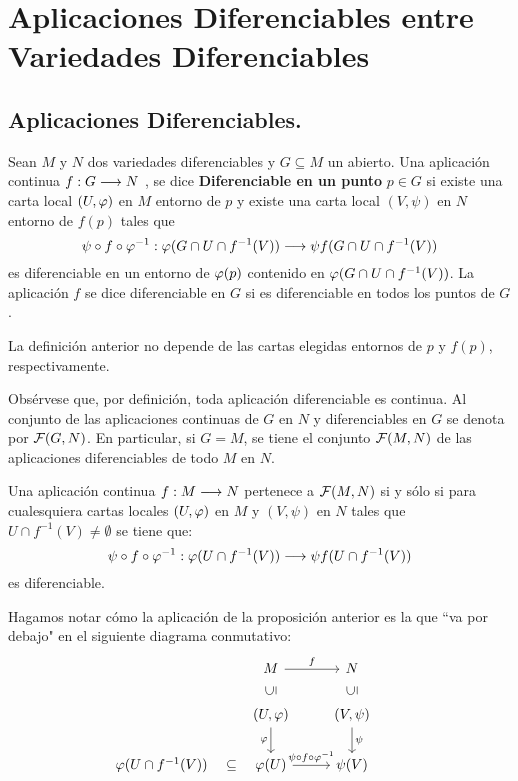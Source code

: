 \documentclass[cursovd_portada.tex]{subfiles}
\begin{document}
\chapter{Aplicaciones Diferenciables entre Variedades Diferenciables}
\section{Aplicaciones Diferenciables.}
\begin{defi}
Sean $M$ y $N$ dos variedades diferenciables y $G\subseteq M$ un abierto. Una aplicación continua $f:G\longrightarrow N$ , se
dice {\bf Diferenciable en un punto} $p\in G$ si existe una carta local $(U,\varphi)$ en $M$ entorno de $p$ y existe
una carta local $(V,\psi)$ en $N$ entorno de $f(p)$ tales que
$$\psi\circ f\circ\varphi^{-1}:\varphi(G\cap U\cap f^{-1}(V))\longrightarrow\psi f(G\cap U\cap f^{-1}(V))$$
es diferenciable en un entorno de $\varphi(p)$ contenido en $\varphi(G\cap U\cap f^{-1}(V))$. La aplicación $f$ se dice
diferenciable en $G$ si es diferenciable en todos los puntos de $G$.
\end{defi}
\begin{prop}
La definición anterior no depende de las cartas elegidas entornos de $p$ y $f(p)$, respectivamente.
\end{prop}
Obsérvese que, por definición, toda aplicación
diferenciable es continua. Al conjunto de las aplicaciones
continuas de $G$ en $N$ y diferenciables en $G$ se denota por
${\cal F}(G,N)$. En particular, si $G=M$, se tiene el conjunto
${\cal F}(M,N)$ de las aplicaciones diferenciables de todo $M$ en
$N$.
\begin{prop}
Una aplicación continua $f:M\longrightarrow N$ pertenece a ${\cal F}(M,N)$ si y sólo si para cualesquiera cartas locales
$(U,\varphi)$ en $M$ y $(V,\psi)$ en $N$ tales que $U\cap f^{-1}(V)\neq\emptyset$ se tiene que:
$$\psi\circ f\circ\varphi^{-1}:\varphi(U\cap f^{-1}(V))\longrightarrow\psi f(U\cap f^{-1}(V))$$
es diferenciable.
\end{prop}
Hagamos notar c\'omo la aplicaci\'on de la proposici\'on anterior es la que ``va por debajo" en el siguiente diagrama conmutativo:
\[
\begin{tikzcd}
& M  \arrow[r, "f"] & N & \\
& (U,\varphi)\arrow[u,phantom, "\rotatebox{90}{$\subseteq$}"]\arrow[d,"\varphi"']  & (V,\psi)\arrow[d,"\psi"]\arrow[u,phantom, "\rotatebox{90}{$\subseteq$}"] &  \\
\varphi(U\cap f^{-1}(V))\arrow[r,phantom, "{\subseteq}"] & \varphi(U) \arrow[r,"\psi\circ f\circ\varphi^{-1}"] & \psi(V)& 
\end{tikzcd}
\]
\end{document}
